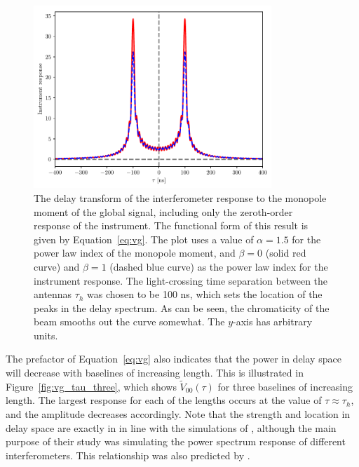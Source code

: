\begin{figure}
\centering
\includegraphics[width=0.8\textwidth]{chapters/global_signal/figures/vg.pdf}
\caption[The delay transform of the interferometer response to the monopole
    moment of the global signal, including only the zeroth-order response of the
    instrument.]{The delay transform of the interferometer response to the monopole
    moment of the global signal, including only the zeroth-order response of the
    instrument. The functional form of this result is given by
    Equation~\ref{eq:vg}. The plot uses a value of $\alpha = 1.5$ for the
    power law index of the monopole moment, and $\beta = 0$ (solid red curve)
    and $\beta = 1$ (dashed blue curve) as the power law index for the
    instrument response. The light-crossing time separation between the antennas
    $\tau_h$ was chosen to be 100 ns, which sets the location of the peaks in
    the delay spectrum. As can be seen, the chromaticity of the beam smooths out
    the curve somewhat. The $y$-axis has arbitrary units.}
\label{fig:vg_tau}
\end{figure}

The prefactor of Equation~\ref{eq:vg} also indicates that the power in delay space will decrease with baselines of increasing length. This is illustrated in Figure~\ref{fig:vg_tau_three}, which shows $\tilde{V}_{00}(\tau)$ for three baselines of increasing length. The largest response for each of the lengths occurs at the value of $\tau\approx\tau_h$, and the amplitude decreases accordingly. Note that the strength and location in delay space are exactly in in line with the simulations of \cite[][see their Figure 2]{Nithya.15b}, although the main purpose of their study was simulating the power spectrum response of different interferometers. This relationship was also predicted by \cite{Venumadhav.16}.

